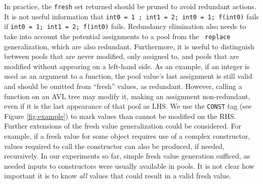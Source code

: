 In practice, the {\tt fresh} set returned should be pruned to avoid
redundant actions.  It is not useful information that {\tt int0 = 1 ; int1 = 2; int0 = 1; f(int0)} fails if {\tt int0 = 1;
  int1 = 2; f(int0)} fails.  Redundancy elimination also needs to take
into account the potential assignments to a pool from the {\tt
  replace} generalization, which are also redundant.  Furthermore, it
is useful to distinguish between pools that are never modified, only
assigned to, and pools that are modified without appearing on a
left-hand side.  As an example, if an integer is used as an argument
to a function, the pool value's last assignment is still valid and
should be omitted from ``fresh'' values, as redundant.  However,
calling a function on an AVL tree may modify it, making an assignment
non-redundant, even if it is the last appearance of that pool as LHS.
We use the {\tt CONST} tag (see Figure \ref{fig:example}) to mark
values than cannot be modified on the RHS.  Further extensions of the
fresh value generalization could be considered.  For example, if a
fresh value for some object requires use of a complex constructor,
values required to call the constructor can also be produced, if
needed, recursively.  In our experiments so
far, simple fresh value generation sufficed, as needed inputs to
constructors were usually available in pools.  It is not clear how
important it is to know \emph{all} values that could result in a valid
fresh value.


